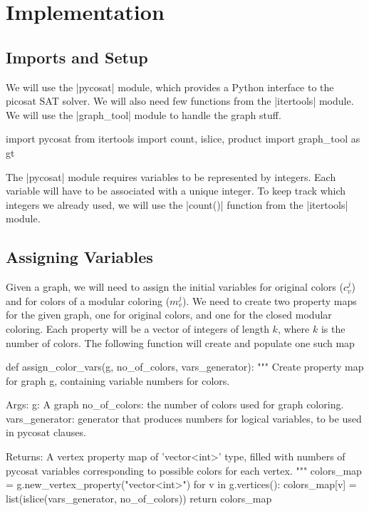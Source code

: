 \documentclass[letterpaper]{article}
\begin{document}
\section{Implementation}

\subsection{Imports and Setup}

We will use the \pyv|pycosat| module, which provides a Python interface to the
picosat SAT solver.  We will also need few functions from the \pyv|itertools|
module. We will use the \pyv|graph_tool| module to handle the graph
stuff. 

\begin{pyblock}
import pycosat
from itertools import count, islice, product
import graph_tool as gt
\end{pyblock}

The \pyv|pycosat| module requires variables to be represented by integers. Each
variable will have to be associated with a unique integer.  To keep track which
integers we already used, we will use the \pyv|count()| function from
the \pyv|itertools| module. 

\subsection{Assigning Variables}

Given a graph, we will need to assign the initial variables for original colors
($c_v^j$) and for colors of a modular coloring ($m_v^j$).  We need to create two property maps for the
given graph, one for original colors, and one for the closed modular coloring.
Each property will be a vector of integers of length $k$, where $k$ is the
number of colors.  The following function will create and populate one such map

\begin{pyblock}
def assign_color_vars(g, no_of_colors, vars_generator):
   """
   Create property map for graph g, containing variable numbers 
   for colors.

   Args:
      g: A graph
      no_of_colors: the number of colors used for graph coloring.
      vars_generator: generator that produces numbers for logical
         variables, to be used in pycosat clauses.

   Returns:
      A vertex property map of 'vector<int>' type, filled with 
      numbers of pycosat variables corresponding to possible 
      colors for each vertex.
   """
   colors_map = g.new_vertex_property("vector<int>")
   for v in g.vertices():
      colors_map[v] = list(islice(vars_generator, no_of_colors))
   return colors_map
\end{pyblock}
\end{document}
